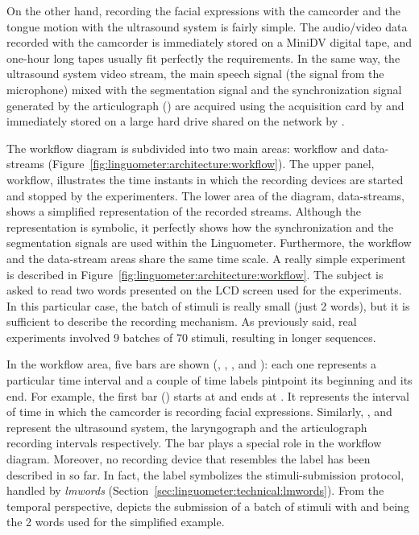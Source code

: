 On the other hand, recording the facial expressions with the camcorder and the
tongue motion with the ultrasound system is fairly simple.
The audio/video data recorded with the camcorder is immediately stored on a
MiniDV digital tape, and
one-hour long tapes usually fit perfectly the requirements.
In the same way, the ultrasound system video stream, the main speech signal
(the signal  from the  microphone) mixed with the segmentation
signal and the synchronization signal generated by the articulograph
() are acquired using the  acquisition card by 
and immediately stored on a large hard drive shared on the network by .

The workflow diagram is subdivided into two main areas: workflow and
data-streams (Figure~\ref{fig:linguometer:architecture:workflow}).
The upper panel, workflow, illustrates the time instants in which the 
recording devices are started and stopped by the experimenters.
The lower area of the diagram, data-streams, shows a simplified representation
of the recorded streams.
Although the representation is symbolic, it perfectly shows how the
synchronization and the segmentation signals are used within the Linguometer.
Furthermore, the workflow and the data-stream areas share the same time scale.
A really simple experiment is described in
Figure~\ref{fig:linguometer:architecture:workflow}.
The subject is asked to read two words presented on the LCD screen used
for the experiments.
In this particular case, the batch of stimuli is really small (just 2 words),
but it is sufficient to describe the recording mechanism.
As previously said, real experiments involved 9 batches of 70 stimuli, resulting
in longer sequences.

In the workflow area, five bars are shown (, , ,
 and ): each one represents a particular time interval and a 
couple of time labels pintpoint its beginning and its end.
For example, the first bar () starts at  and ends at 
.
It represents the interval of time in which the camcorder is recording facial 
expressions.
Similarly, ,  and  represent the ultrasound system, the
laryngograph and the articulograph recording intervals respectively.
The  bar plays a special role in the workflow diagram.
Moreover, no recording device that resembles the  label has been
described in so far.
In fact, the  label symbolizes the stimuli-submission protocol, handled 
by \emph{lmwords} (Section~\ref{sec:linguometer:technical:lmwords}).
From the temporal perspective,  depicts the submission of a batch of 
stimuli with  and  being the 2 words used for the simplified
example.


